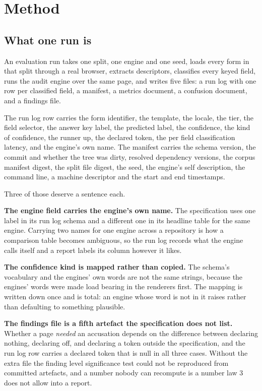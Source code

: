 \chapter{Method}
\label{ch:method}

\section{What one run is}

An evaluation run takes one split, one engine and one seed, loads every form in
that split through a real browser, extracts descriptors, classifies every keyed
field, runs the audit engine over the same page, and writes five files: a run
log with one row per classified field, a manifest, a metrics document, a
confusion document, and a findings file.

The run log row carries the form identifier, the template, the locale, the tier,
the field selector, the answer key label, the predicted label, the confidence,
the kind of confidence, the runner up, the declared token, the per field
classification latency, and the engine's own name. The manifest carries the
schema version, the commit and whether the tree was dirty, resolved dependency
versions, the corpus manifest digest, the split file digest, the seed, the
engine's self description, the command line, a machine descriptor and the start
and end timestamps.

Three of those deserve a sentence each.

\textbf{The engine field carries the engine's own name.} The specification uses
one label in its run log schema and a different one in its headline table for
the same engine. Carrying two names for one engine across a repository is how a
comparison table becomes ambiguous, so the run log records what the engine calls
itself and a report labels its column however it likes.

\textbf{The confidence kind is mapped rather than copied.} The schema's
vocabulary and the engines' own words are not the same strings, because the
engines' words were made load bearing in the renderers first. The mapping is
written down once and is total: an engine whose word is not in it raises rather
than defaulting to something plausible.

\textbf{The findings file is a fifth artefact the specification does not list.}
Whether a page \emph{needed} an accusation depends on the difference between
declaring nothing, declaring off, and declaring a token outside the
specification, and the run log row carries a declared token that is null in all
three cases. Without the extra file the finding level significance test could not
be reproduced from committed artefacts, and a number nobody can recompute is a
number law 3 does not allow into a report.

